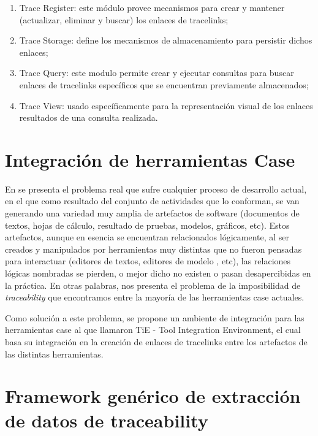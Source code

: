\documentclass[a4paper,12pt,oneside,spanish]{book}
\begin{document}
\begin{enumerate}
\item Trace Register: este módulo provee mecanismos para crear y mantener (actualizar, eliminar y buscar) los enlaces de tracelinks;
\item Trace Storage: define los mecanismos de almacenamiento para persistir dichos enlaces;
\item Trace Query: este modulo permite crear y ejecutar consultas para buscar enlaces de tracelinks específicos que se encuentran previamente almacenados;
\item Trace View: usado específicamente para la representación visual de los enlaces resultados de una consulta realizada.
\end{enumerate}


\section{Integración de herramientas Case}

En \cite{KlarRoseSchurr} se presenta el problema real que sufre cualquier proceso de desarrollo actual, en el que como resultado del conjunto de actividades que lo conforman, se van generando una variedad muy amplia de artefactos de software (documentos de textos, hojas de cálculo, resultado de pruebas, modelos, gráficos, etc). Estos artefactos, aunque en esencia se encuentran relacionados lógicamente, al ser creados y manipulados por herramientas muy distintas que no fueron pensadas para interactuar (editores de textos, editores de modelo , etc), las relaciones lógicas nombradas se pierden, o mejor dicho no existen o pasan desapercibidas en la práctica. En otras palabras, nos presenta el problema de la imposibilidad de \textit{traceability} que encontramos entre la mayoría de las herramientas \gls{case} actuales.

Como solución a este problema, se propone un ambiente de integración para las herramientas \gls{case} al que llamaron TiE - Tool Integration Environment, el cual basa su integración en la creación de enlaces de tracelinks entre los artefactos de las distintas herramientas.

\section{Framework genérico de extracción de datos de traceability}
\end{document}

